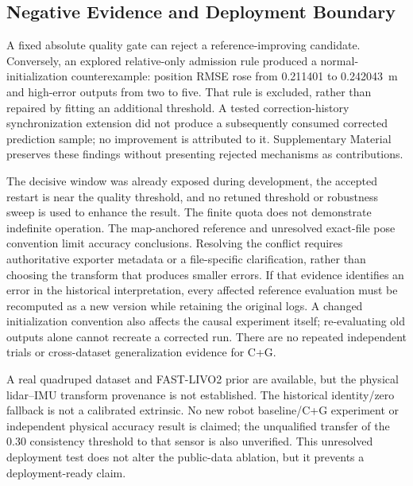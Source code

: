 \documentclass[journal,10pt,letterpaper]{IEEEtran}
\begin{document}
\subsection{Negative Evidence and Deployment Boundary}
A fixed absolute quality gate can reject a reference-improving candidate. Conversely, an explored relative-only admission rule produced a normal-initialization counterexample: position RMSE rose from 0.211401 to 0.242043~m and high-error outputs from two to five. That rule is excluded, rather than repaired by fitting an additional threshold. A tested correction-history synchronization extension did not produce a subsequently consumed corrected prediction sample; no improvement is attributed to it. Supplementary Material preserves these findings without presenting rejected mechanisms as contributions.

The decisive window was already exposed during development, the accepted restart is near the quality threshold, and no retuned threshold or robustness sweep is used to enhance the result. The finite quota does not demonstrate indefinite operation. The map-anchored reference and unresolved exact-file pose convention limit accuracy conclusions. Resolving the conflict requires authoritative exporter metadata or a file-specific clarification, rather than choosing the transform that produces smaller errors. If that evidence identifies an error in the historical interpretation, every affected reference evaluation must be recomputed as a new version while retaining the original logs. A changed initialization convention also affects the causal experiment itself; re-evaluating old outputs alone cannot recreate a corrected run. There are no repeated independent trials or cross-dataset generalization evidence for C+G.

A real quadruped dataset and FAST-LIVO2 prior are available, but the physical lidar--IMU transform provenance is not established. The historical identity/zero fallback is not a calibrated extrinsic. No new robot baseline/C+G experiment or independent physical accuracy result is claimed; the unqualified transfer of the 0.30 consistency threshold to that sensor is also unverified. This unresolved deployment test does not alter the public-data ablation, but it prevents a deployment-ready claim.
\end{document}
